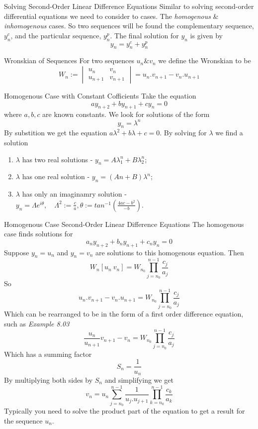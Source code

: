 \documentclass[11pt,a4paper]{article}
\begin{document}
\subtitle{Remark 8.06 - }{Solving Second-Order Linear Difference Equations}
Similar to solving second-order differential equations we need to consider to cases. The \textit{homogenous} \& \textit{inhomogenous} cases.
So two sequences will be found the complementary sequence, $y_n^c$, and the particular sequence, $y_n^p$. The final solution for $y_n$ is given by $$y_n = y_n^c + y_n^p$$

\subtitle{Definition 8.07 - }{Wronskian of Sequences}
For two sequences $u_n \& v_n$ we define the Wronskian to be $$W_n := \begin{vmatrix} u_n & v_n \\ u_{n+1} & v_{n+1} \end{vmatrix} = u_n.v_{n+1} - v_n.u_{n+1}$$

\subtitle{Theorem 8.08 - }{Homogenous Case with Constant Cofficients}
Take the equation $$ay_{n+2} + by_{n+1} + cy_n = 0$$ where $a, b, c$ are known constants. We look for solutions of the form $$y_n = \lambda^n$$
By substition we get the equation $a\lambda^2 + b\lambda + c = 0$. By solving for $\lambda$ we find a solution
\begin{enumerate}[label=\roman*)]
  \item $\lambda$ has two real solutions - $y_n = A\lambda_1^n + B\lambda_2^n$;
  \item $\lambda$ has one real solution - $y_n = (An + B)\lambda^n$;
  \item $\lambda$ has only an imaginamry solution - $y_n = \Lambda e^{i\theta},\quad \Lambda^2 := \frac{c}{a}, \theta := tan^{-1}(\frac{4ac - b^2}{-b})$.\\
\end{enumerate}

\subtitle{Theorem 8.09 - }{Homogenous Case Second-Order Linear Difference Equations}
The homogenous case finds solutions for $$a_ny_{n+2} + b_ny_{n+1} + c_ny_n = 0$$
Suppose $y_n = u_n$ and $y_n = v_n$ are solutions to this homogenous equation. Then $$W_n [u_n\ v_n] = W_{n_0}\prod_{j=n_0}^{n-1} \frac{c_j}{a_j}$$
So $$ u_n.v_{n+1} - v_n.u_{n+1} = W_{n_0}\prod_{j=n_0}^{n-1} \frac{c_j}{a_j}$$
Which can be rearranged to be in the form of a first order difference equation, such as \textit{Example 8.03}
$$\frac{u_n}{u_{n+1}}v_{n+1} - v_n = W_{n_0}\prod_{j=n_0}^{n-1} \frac{c_j}{a_j}$$
Which has a summing factor $$S_n = \frac{1}{u_n}$$
By multiplying both sides by $S_n$ and simplifying we get
$$v_n = u_n \sum_{j=n_0}^{n-1} \frac{1}{u_j.u_{j+1}} \prod_{k=n_0}^{n-1} \frac{c_k}{a_k}$$
Typically you need to solve the product part of the equation to get a result for the sequence $u_n$. \\
\end{document}
